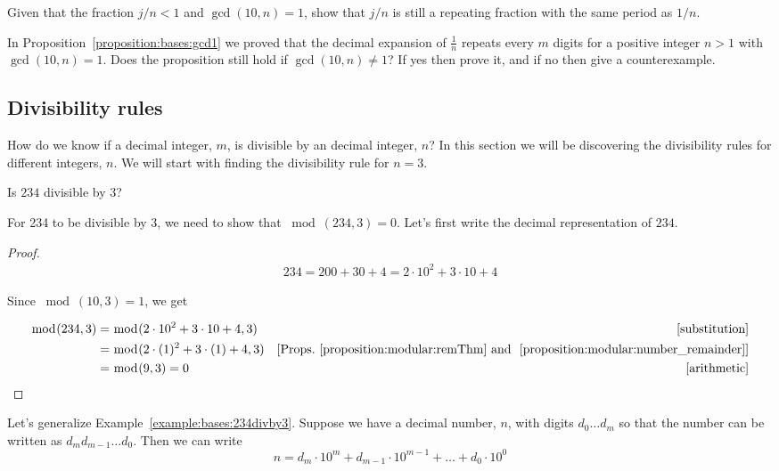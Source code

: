 \begin{exercise}\label{exercise:bases:inttimefrac}
 Given that the fraction $j/n < 1$ and $\gcd(10,n)=1$, show that $j/n$  is still a repeating fraction with the same period as $1/n$.
\end{exercise}

\begin{exercise}
In Proposition~\ref{proposition:bases:gcd1} we proved that the decimal expansion of $\frac{1}{n}$ repeats every $m$ digits for a positive integer $n>1$ with 
$\gcd(10,n)=1$. Does the proposition still hold if $\gcd(10,n)\neq 1$? If yes then prove it, and  if no then give a counterexample.
\end{exercise}
\subsection{Divisibility rules}

How do we know if a decimal integer, $m$, is divisible by an decimal integer, $n$? In this section we will be discovering the divisibility rules for different integers, $n$. We will start with finding the divisibility rule for $n=3$.

\begin{example}\label{example:bases:234divby3}
Is $234$ divisible by $3$?
\end{example}
For 234 to be divisible by 3, we need to show that $\bmod(234,3)=0$. Let's first write the decimal representation of $234$. 
 
\begin{proof}

\begin{align*}
234=200+30+4=2\cdot 10^{2}+3\cdot 10+4
\end{align*}

Since $\bmod(10,3)=1$, we get 

\begin{align*}
\bmod(234,3)&=\bmod(2 \cdot 10^{2}+3 \cdot 10+4,3) & [\textrm{substitution}]\\
&=\bmod(2\cdot(1)^2+3\cdot(1)+4,3) & [\textrm{Props.~\ref{proposition:modular:remThm} and ~\ref{proposition:modular:number_remainder}}]\\
&=\bmod(9,3)=0 & [\textrm{arithmetic}]
\end{align*}
\end{proof}

Let's generalize Example~\ref{example:bases:234divby3}. Suppose we have a decimal number, $n$, with digits $d_{0}\dots d_{m}$  so that the number can be written as $d_{m}d_{m-1}\dots d_{0}$. Then we can write 
\begin{equation*}
n=d_{m}\cdot 10^{m}+d_{m-1}\cdot 10^{m-1}+\dots +d_{0}\cdot 10^{0}
\end{equation*}

